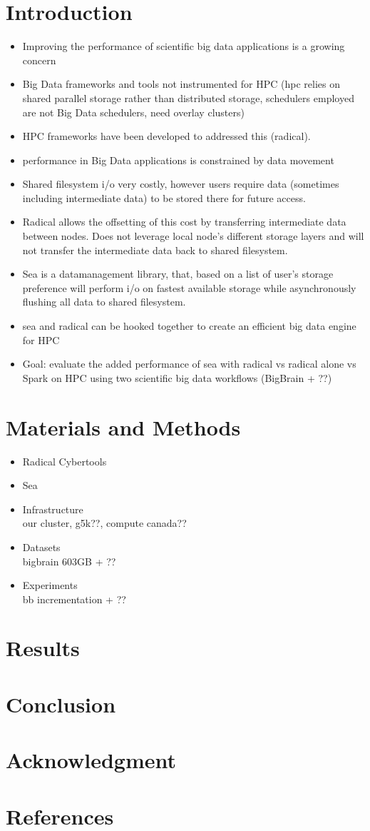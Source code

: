 \documentclass[conference]{IEEEtran}
\begin{document}
\section{Introduction}
\begin{itemize}
\item Improving the performance of scientific big data applications is a growing concern
\item Big Data frameworks and tools not instrumented for HPC (hpc relies on shared parallel storage rather than distributed storage, schedulers employed are not Big Data schedulers, need overlay clusters)
\item HPC frameworks have been developed to addressed this (radical).
\item performance in Big Data applications is constrained by data movement
\item Shared filesystem i/o very costly, however users require data (sometimes including intermediate data) to be stored there for future access.
\item Radical allows the offsetting of this cost by transferring intermediate data between nodes. Does not leverage local node's different storage layers and will not transfer the intermediate data back to shared filesystem.
\item Sea is a datamanagement library, that, based on a list of user's storage preference will perform i/o on fastest available storage while asynchronously flushing all data to shared filesystem.
\item sea and radical can be hooked together to create an efficient big data engine for HPC
\item Goal: evaluate the added performance of sea with radical vs radical alone vs Spark on HPC using two scientific big data workflows (BigBrain + ??)
\end{itemize}
\section{Materials and Methods}
\begin{itemize}
    \item{Radical Cybertools}
    \item{Sea}
    \item{Infrastructure} \\our cluster, g5k??, compute canada??
    \item{Datasets} \\ bigbrain 603GB + ??
    \item{Experiments} \\ bb incrementation + ??
\end{itemize}
\section{Results}
\section{Conclusion}

\section*{Acknowledgment}

\section*{References}
\end{document}
